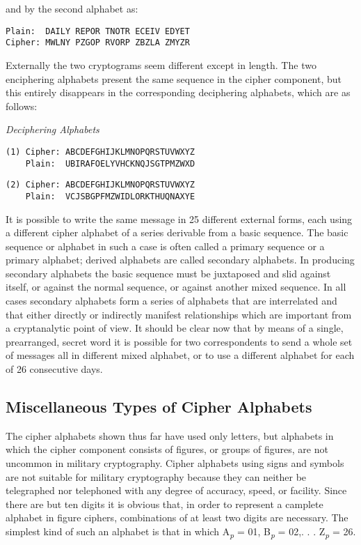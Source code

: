 and by the second alphabet as:
\begin{verbatim}
Plain:  DAILY REPOR TNOTR ECEIV EDYET
Cipher: MWLNY PZGOP RVORP ZBZLA ZMYZR
\end{verbatim}

Externally the two cryptograms seem different except in length. The two
enciphering alphabets present the same sequence in the cipher component, but this entirely disappears in the corresponding deciphering
alphabets, which are as follows:

\begin{center}
\textit{Deciphering Alphabets}
\end{center}

\begin{verbatim}
(1) Cipher: ABCDEFGHIJKLMNOPQRSTUVWXYZ
    Plain:  UBIRAFOELYVHCKNQJSGTPMZWXD
\end{verbatim}
\begin{verbatim}
(2) Cipher: ABCDEFGHIJKLMNOPQRSTUVWXYZ
    Plain:  VCJSBGPFMZWIDLORKTHUQNAXYE
\end{verbatim}

It is possible to write the same message in 25 different external forms,
each using a different cipher alphabet of a series derivable from a
basic sequence. The basic sequence or alphabet in such a case is often
called a primary sequence or a primary alphabet; derived alphabets
are called secondary alphabets. In producing secondary alphabets the
basic sequence must be juxtaposed and slid against itself, or against
the normal sequence, or against another mixed sequence. In all cases
secondary alphabets form a series of alphabets that are interrelated and
that either directly or indirectly manifest relationships which are important from a cryptanalytic point of view. It should be clear now that
by means of a single, prearranged, secret word it is possible for two
correspondents to send a whole set of messages all in different mixed
alphabet, or to use a different alphabet for each of 26 consecutive days.

\subsection{Miscellaneous Types of Cipher Alphabets}

\mypara The cipher alphabets shown thus far have used only letters, but
alphabets in which the cipher component consists of ﬁgures, or groups
of ﬁgures, are not uncommon in military cryptography. Cipher alphabets
using signs and symbols are not suitable for military cryptography because they can neither be telegraphed nor telephoned with any degree
of accuracy, speed, or facility. Since there are but ten digits it is obvious
that, in order to represent a camplete alphabet in ﬁgure ciphers, combinations of at least two digits are necessary. The simplest kind of such
an alphabet is that in which A\textsubscript{\textit{p}} = 01, B\textsubscript{\textit{p}} = 02,. . . Z\textsubscript{\textit{p}} = 26.

